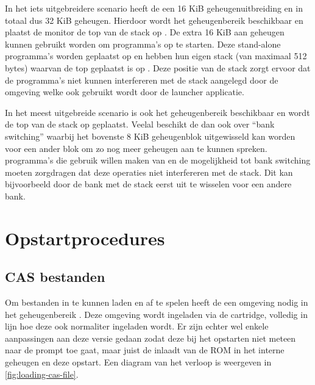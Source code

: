 
In het iets uitgebreidere scenario heeft de  een 16 KiB geheugenuitbreiding en in totaal dus 32 KiB geheugen. Hierdoor wordt het geheugenbereik  beschikbaar en plaatst de monitor de top van de stack op . De extra 16 KiB aan geheugen kunnen gebruikt worden om \prg programma's op te starten. Deze stand-alone programma's worden geplaatst op  en hebben hun eigen stack (van maximaal 512 bytes) waarvan de top geplaatst is op . Deze positie van de stack zorgt ervoor dat de programma's niet kunnen interfereren met de stack aangelegd door de \basic omgeving welke ook gebruikt wordt door de launcher applicatie.

In het meest uitgebreide scenario is ook het geheugenbereik  beschikbaar en wordt de top van de \basic stack op  geplaatst. Veelal beschikt de  dan ook over ``bank switching'' waarbij het bovenste 8 KiB geheugenblok uitgewisseld kan worden voor een ander blok om zo nog meer geheugen aan te kunnen spreken. \prg programma's die gebruik willen maken van  en de mogelijkheid tot bank switching moeten zorgdragen dat deze operaties niet interfereren met de \basic stack. Dit kan bijvoorbeeld door de bank met de \basic stack eerst uit te wisselen voor een andere bank.

%
%
%
\section{Opstartprocedures}

%
%
\subsection{CAS bestanden}


Om \cas bestanden in te kunnen laden en af te spelen heeft de \product een \basic omgeving nodig in het geheugenbereik . Deze \basic omgeving wordt ingeladen via de  cartridge, volledig in lijn hoe deze ook normaliter ingeladen wordt. Er zijn echter wel enkele aanpassingen aan deze \basic versie gedaan zodat deze bij het opstarten niet meteen naar de \basic prompt toe gaat, maar juist de \launcher inlaadt van de  ROM in het interne geheugen en deze opstart. Een diagram van het verloop is weergeven in \cref{fig:loading-cas-file}.

